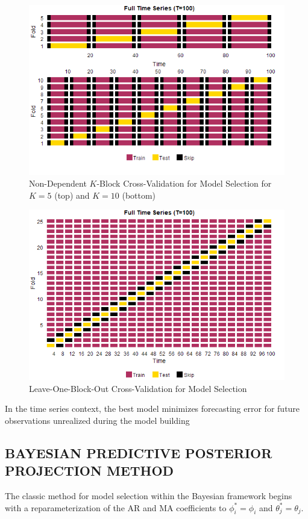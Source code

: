 \begin{figure}[htbp!]
	\caption{Non-Dependent $K$-Block Cross-Validation for Model Selection for $K=5$ (top) and $K=10$ (bottom)}
	\label{fig:bcvplots}
	\includegraphics[scale=0.7]{bcvplots}
\end{figure}

\begin{figure}[htbp!]
	\caption{Leave-One-Block-Out Cross-Validation for Model Selection}
	\label{fig:lobocvplots}
	\includegraphics[scale=0.7]{lobocvplots}
\end{figure}

In the time series context, the best model minimizes forecasting error for future observations  unrealized during the model building  

\subsection{BAYESIAN PREDICTIVE POSTERIOR PROJECTION METHOD}
The classic method for model selection within the Bayesian framework begins with a reparameterization of the AR and MA coefficients to $\phi_i^*=\phi_i$ and $\theta_j^*=\theta_j$.

